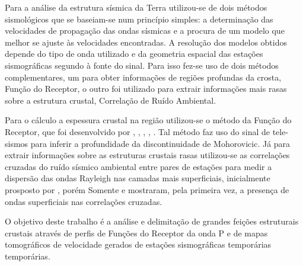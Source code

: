 Para a análise da estrutura sísmica da Terra utilizou-se de dois métodos sismológicos que se baseiam-se num princípio simples: a determinação das velocidades de propagação das ondas sísmicas e a procura de um modelo que melhor se ajuste às velocidades encontradas. A resolução dos modelos obtidos depende do tipo de onda utilizado e da geometria espacial das estações sismográficas segundo à fonte do sinal. Para isso fez-se uso de dois métodos complementares, um para obter informações de regiões profundas da crosta, Função do Receptor, o outro foi utilizado para extrair informações mais rasas sobre a estrutura crustal, Correlação de Ruído Ambiental.

Para o cálculo a espessura crustal na região utilizou-se o método da Função do Receptor, que foi desenvolvido por \cite{clayton_source_1976}, \cite{Langston_1977}, \cite{ammon_isolation_1991}, \cite{cassidy_numerical_1992}, \cite{Zhu_Kanamori_2000}. Tal método faz uso do sinal de tele-sismos para inferir a profundidade da discontinuidade de Mohorovicic. Já para extrair informações sobre as estruturas crustais rasas utilizou-se as correlações cruzadas do ruído sísmico ambiental entre pares de estações para medir a dispersão das ondas Rayleigh nas camadas mais superficiais, inicialmente prosposto por \cite{aki_space_1957}, porém Somente \cite{campillo_long-range_2003}  e \cite{shapiro_emergence_2004} mostraram, pela primeira vez, a  presença de ondas superficiais nas correlações cruzadas.

O objetivo deste trabalho é a análise e delimitação de grandes feições estruturais crustais através de perfis de Funções do Receptor da onda P e de mapas tomográficos de velocidade gerados de estações sismográficas temporárias temporárias.